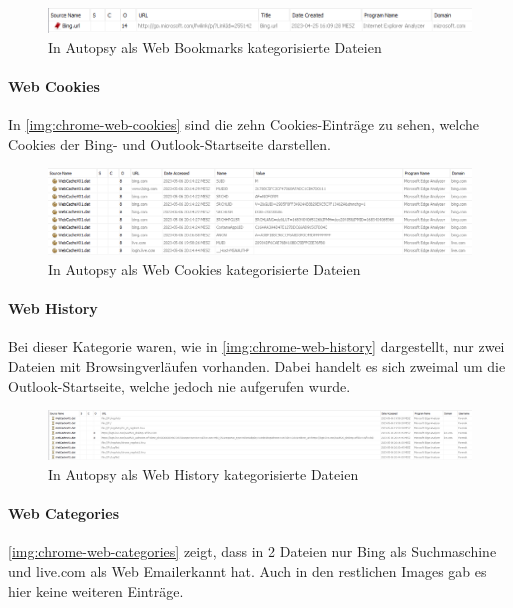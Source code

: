 \begin{appendices}
\begin{figure}[ht]
	\centering
	\includegraphics[width=\textwidth]{bilder/CHBoo.png}
	\caption{In Autopsy als \glqq{}Web Bookmarks\grqq{} kategorisierte Dateien}
	\label{img:chrome-boo}
\end{figure}

\paragraph*{Web Cookies}
In \autoref{img:chrome-web-cookies} sind die zehn Cookies-Einträge zu sehen, welche Cookies der Bing- und Outlook-Startseite darstellen. 

\begin{figure}[ht]
	\centering
	\includegraphics[width=\textwidth]{bilder/CHCoo.png}
	\caption{In Autopsy als \glqq{}Web Cookies\grqq{} kategorisierte Dateien}
	\label{img:chrome-web-cookies}  
\end{figure}

\paragraph*{Web History}

Bei dieser Kategorie waren, wie in \autoref{img:chrome-web-history} dargestellt, nur zwei Dateien mit Browsingverläufen vorhanden. Dabei handelt es sich zweimal um die Outlook-Startseite, welche jedoch nie aufgerufen wurde.

\begin{figure}[ht]
	\centering
	\includegraphics[width=\textwidth]{bilder/CHHis.png}
	\caption{In Autopsy als \glqq{}Web History\grqq{} kategorisierte Dateien}
	\label{img:chrome-web-history}  
\end{figure}

\paragraph*{Web Categories}
\autoref{img:chrome-web-categories} zeigt, dass in 2 Dateien nur Bing als Suchmaschine und live.com als \glqq{}Web Email\grqq erkannt hat. Auch in den restlichen Images gab es hier keine weiteren Einträge.


\end{appendices}
